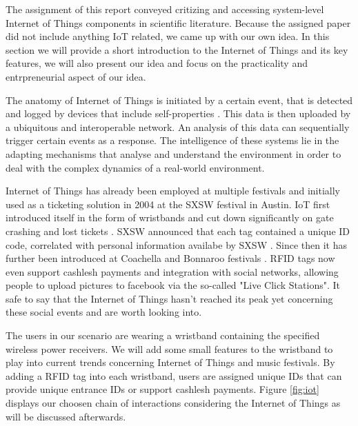 The assignment of this report conveyed critizing and accessing system-level Internet of Things components in scientific literature. Because the assigned paper \cite{paper} did not include anything IoT related, we came up with our own idea.
In this section we will provide a short introduction to the Internet of Things and its key features, we will also present our idea and focus on the practicality and entrpreneurial aspect of our idea.

The anatomy of Internet of Things is initiated by a certain event, that is detected and logged by devices that include self-properties \cite{lecture}. This data is then uploaded by a ubiquitous and interoperable network. An analysis of this data can sequentially trigger certain events as a response. The intelligence of these systems lie in the adapting mechanisms that analyse and understand the environment in order to deal with the complex dynamics of a real-world environment.

Internet of Things has already been employed at multiple festivals and initially used as a ticketing solution in 2004 at the SXSW festival in Austin. IoT first introduced itself in the form of wristbands and cut down significantly on gate crashing and lost tickets \cite{thingmagic}. SXSW announced that each tag contained a unique ID code, correlated with personal information availabe by SXSW \cite{sxsw}. Since then it has further been introduced at Coachella and Bonnaroo festivals \cite{coachella} \cite{bonnaroo}. RFID tags now even support cashlesh payments and integration with social networks, allowing people to upload pictures to facebook via the so-called "Live Click Stations"\cite{thingmagic}. It safe to say that the Internet of Things hasn't reached its peak yet concerning these social events and are worth looking into.

The users in our scenario are wearing a wristband containing the specified wireless power receivers. We will add some small features to the wristband to play into current trends concerning Internet of Things and music festivals. By adding a RFID tag into each wristband, users are assigned unique IDs that can provide unique entrance IDs or support cashlesh payments. Figure \ref{fig:iot} displays our choosen chain of interactions considering the Internet of Things as will be discussed afterwards. 

